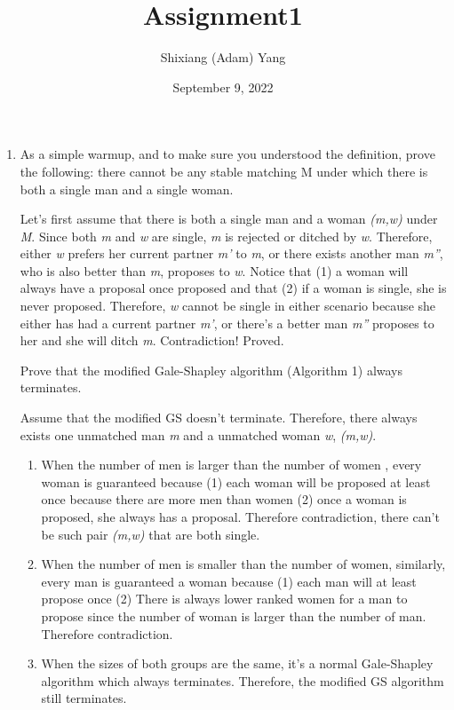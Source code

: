 \documentclass{homework}
\author{Shixiang (Adam) Yang}
\date{September 9, 2022}
\title{Assignment1}
\begin{document}
 \maketitle

\begin{enumerate}
    \item
    \question  As a simple warmup, and to make sure you understood the definition, prove the following: there cannot be any stable matching M under which there is both a single man and a single woman.

    Let's first assume that there is both a single man and a woman \textit{(m,w)} under \textit{M}. Since both \textit{m} and \textit{w} are single, \textit{m} is rejected or ditched by \textit{w}. Therefore, either \textit{w} prefers her current partner \textit{m'} to \textit{m}, or there exists another man \textit{m''}, who is also better than \textit{m}, proposes to \textit{w}. Notice that (1) a woman will always have a proposal once proposed and that (2) if a woman is single, she is never proposed. Therefore, \textit{w} cannot be single in either scenario because she either has had a current partner \textit{m'}, or there's a better man \textit{m''} proposes to her and she will ditch \textit{m}. Contradiction! Proved.
    
    \question  Prove that the modified Gale-Shapley algorithm (Algorithm 1) always terminates.
    
    Assume that the modified GS doesn't terminate. Therefore, there always exists one unmatched man \textit{m} and a unmatched woman \textit{w}, \textit{(m,w)}. 
    \begin{enumerate}
        \item When the number of men is larger than the number of women , every woman is guaranteed because (1) each woman will be proposed at least once because there are more men than women (2) once a woman is proposed, she always has a proposal. Therefore contradiction, there can't be such pair \textit{(m,w)} that are both single.
        \item When the number of men  is smaller than the number of women, similarly, every man is guaranteed a woman because (1) each man will at least propose once (2) There is always lower ranked women for a man to propose since the number of woman is larger than the number of man. Therefore contradiction.
        \item When the sizes of both groups are the same, it's a normal Gale-Shapley algorithm which always terminates. Therefore, the modified GS algorithm still terminates.
    \end{enumerate}


\end{enumerate}
\end{document}
